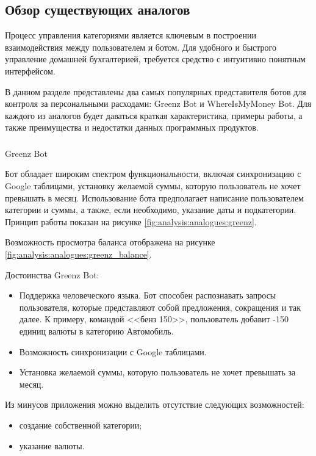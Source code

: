 \subsection{Обзор существующих аналогов}
\label{sec:analysis:analogues}

Процесс управления категориями является ключевым в построении взаимодействия между пользователем и ботом. Для удобного и быстрого управление домашней бухгалтерией, требуется средство с интуитивно понятным интерфейсом.

В данном разделе представлены два самых популярных представителя ботов для контроля за персональными расходами: Greenz Bot и \linebreak WhereIsMyMoney Bot. Для каждого из аналогов будет даваться краткая характеристика, примеры работы, а также преимущества и недостатки данных программных продуктов.

\subsubsection{} Greenz Bot
\label{sec:analysis:analogues:greenz}

Бот обладает широким спектром функциональности, включая синхронизацию с Google таблицами, установку желаемой суммы, которую пользователь не хочет превышать в месяц. Использование бота предполагает написание пользователем категории и суммы, а также, если необходимо, указание даты и подкатегории. Принцип работы показан на рисунке \ref{fig:analysis:analogues:greenz}.

Возможность просмотра баланса отображена на рисунке \ref{fig:analysis:analogues:greenz_balance}.

Достоинства Greenz Bot:

\begin{itemize}
	\item Поддержка человеческого языка. Бот способен распознавать запросы пользователя, которые представляют собой предложения, сокращения и так далее. К примеру, командой <<бенз 150>>, пользователь добавит -150 единиц валюты в категорию Автомобиль.
	\item Возможность синхронизации с Google таблицами.
	\item Установка желаемой суммы, которую пользователь не хочет превышать за месяц.
\end{itemize}

Из минусов приложения можно выделить отсутствие следующих возможностей:

\begin{itemize}
	\item создание собственной категории;
	\item указание валюты.
\end{itemize}

